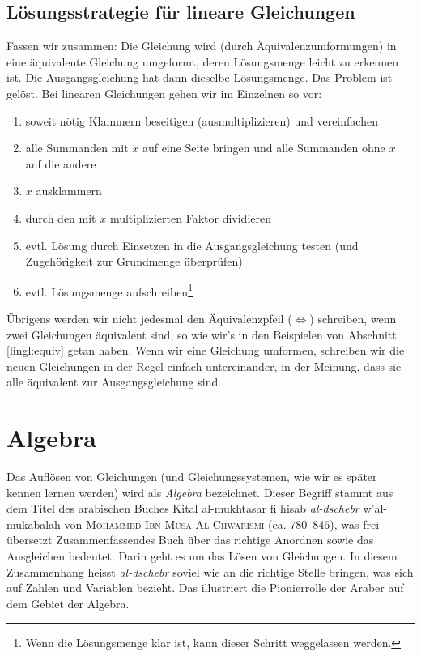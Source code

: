 \documentclass[%
11pt,%
twoside,%
titlepage,%
german,%
]{scrartcl}
\begin{document}
\subsection{L\"osungsstrategie f\"ur lineare Gleichungen}
\label{lingl:strategie}

Fassen wir zusammen: Die Gleichung wird (durch \"Aquivalenzumformungen) in eine \"aquivalente Gleichung umgeformt, deren L\"osungsmenge leicht zu erkennen ist. Die Ausgangsgleichung hat dann dieselbe L\"osungsmenge. Das Problem ist gel\"ost. Bei linearen Gleichungen gehen wir im Einzelnen so vor:
\begin{enumerate}
\item soweit n\"otig Klammern beseitigen (ausmultiplizieren) und vereinfachen
\item alle Summanden mit $x$ auf eine Seite bringen und alle Summanden ohne $x$ auf die andere
\item $x$ ausklammern
\item durch den mit $x$ multiplizierten Faktor dividieren
\item evtl. L\"osung durch Einsetzen in die Ausgangsgleichung testen (und Zugeh\"origkeit zur Grundmenge \"uberpr\"ufen)
\item evtl. L\"osungsmenge aufschreiben\footnote{Wenn die L\"osungsmenge klar ist, kann dieser Schritt weggelassen werden.}
\end{enumerate}

\"Ubrigens werden wir nicht jedesmal den \"Aquivalenzpfeil ($\Leftrightarrow$) schreiben, wenn zwei Gleichungen \"aquivalent sind, so wie wir's in den Beispielen von Abschnitt \ref{lingl:equiv} getan haben. Wenn wir eine Gleichung umformen, schreiben wir die neuen Gleichungen in der Regel einfach untereinander, in der Meinung, dass sie alle \"aquivalent zur Ausgangsgleichung sind.

\section{Algebra}
\label{lingl:algebra}

Das Aufl\"osen von Gleichungen (und Gleichungssystemen, wie wir es sp\"ater kennen lernen werden) wird als \emph{Algebra} bezeichnet. Dieser Begriff stammt aus dem Titel des arabischen Buches Kital al-mukhtasar fi hisab \emph{al-dschebr} w'al-mukabalah von \textsc{Mohammed Ibn Musa Al Chwarismi} (ca. 780--846), was frei \"ubersetzt Zusammenfassendes Buch \"uber das richtige Anordnen sowie das Ausgleichen bedeutet. Darin geht es um das L\"osen von Gleichungen. In diesem Zusammenhang heisst \emph{al-dschebr} soviel wie an die richtige Stelle bringen, was sich auf Zahlen und Variablen bezieht. Das illustriert die Pionierrolle der Araber auf dem Gebiet der Algebra.
\end{document}
